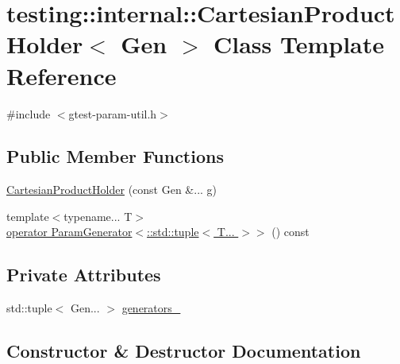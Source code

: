 \hypertarget{classtesting_1_1internal_1_1CartesianProductHolder}{}\section{testing\+:\+:internal\+:\+:Cartesian\+Product\+Holder$<$ Gen $>$ Class Template Reference}
\label{classtesting_1_1internal_1_1CartesianProductHolder}


{\ttfamily \#include $<$gtest-\/param-\/util.\+h$>$}

\subsection*{Public Member Functions}
\begin{DoxyCompactItemize}
\item 
\hyperlink{classtesting_1_1internal_1_1CartesianProductHolder_a3584d073ddbe024d6bc478a988c4111c}{Cartesian\+Product\+Holder} (const Gen \&... g)
\item 
{\footnotesize template$<$typename... T$>$ }\\\hyperlink{classtesting_1_1internal_1_1CartesianProductHolder_ab29313123e08f3fc7111eac6e80351a5}{operator Param\+Generator$<$\+::std\+::tuple$<$ T... $>$$>$} () const
\end{DoxyCompactItemize}
\subsection*{Private Attributes}
\begin{DoxyCompactItemize}
\item 
std\+::tuple$<$ Gen... $>$ \hyperlink{classtesting_1_1internal_1_1CartesianProductHolder_a6efba108d2025dbbce1129506284feaf}{generators\+\_\+}
\end{DoxyCompactItemize}


\subsection{Constructor \& Destructor Documentation}
\mbox{\label{classtesting_1_1internal_1_1CartesianProductHolder_a3584d073ddbe024d6bc478a988c4111c}} 
